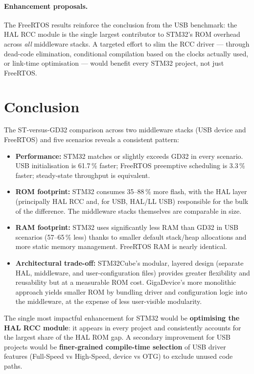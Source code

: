 \paragraph{Enhancement proposals.}
The FreeRTOS results reinforce the conclusion from the USB benchmark: the HAL RCC module
is the single largest contributor to STM32's ROM overhead across \emph{all} middleware
stacks. A targeted effort to slim the RCC driver --- through dead-code elimination,
conditional compilation based on the clocks actually used, or link-time optimisation ---
would benefit every STM32 project, not just FreeRTOS.

\section*{Conclusion}

The ST-versus-GD32 comparison across two middleware stacks (USB device and FreeRTOS) and
five scenarios reveals a consistent pattern:

\begin{itemize}
  \item \textbf{Performance:} STM32 matches or slightly exceeds GD32 in every scenario.
    USB initialisation is 61.7\,\% faster; FreeRTOS preemptive scheduling is 3.3\,\% faster;
    steady-state throughput is equivalent.
  \item \textbf{ROM footprint:} STM32 consumes 35--88\,\% more flash, with the HAL layer
    (principally HAL RCC and, for USB, HAL/LL USB) responsible for the bulk of the
    difference. The middleware stacks themselves are comparable in size.
  \item \textbf{RAM footprint:} STM32 uses significantly less RAM than GD32 in USB
    scenarios (57--65\,\% less) thanks to smaller default stack/heap allocations and more
    static memory management. FreeRTOS RAM is nearly identical.
  \item \textbf{Architectural trade-off:} STM32Cube's modular, layered design (separate
    HAL, middleware, and user-configuration files) provides greater flexibility and
    reusability but at a measurable ROM cost. GigaDevice's more monolithic approach yields
    smaller ROM by bundling driver and configuration logic into the middleware, at the
    expense of less user-visible modularity.
\end{itemize}

The single most impactful enhancement for STM32 would be \textbf{optimising the HAL RCC
module}: it appears in every project and consistently accounts for the largest share of the
HAL ROM gap. A secondary improvement for USB projects would be \textbf{finer-grained
compile-time selection} of USB driver features (Full-Speed vs High-Speed, device vs OTG)
to exclude unused code paths.

\pagebreak